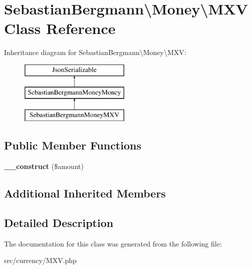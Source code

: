 \hypertarget{classSebastianBergmann_1_1Money_1_1MXV}{}\section{Sebastian\+Bergmann\textbackslash{}Money\textbackslash{}M\+X\+V Class Reference}
\label{classSebastianBergmann_1_1Money_1_1MXV}
Inheritance diagram for Sebastian\+Bergmann\textbackslash{}Money\textbackslash{}M\+X\+V\+:\begin{figure}[H]
\begin{center}
\leavevmode
\includegraphics[height=3.000000cm]{classSebastianBergmann_1_1Money_1_1MXV}
\end{center}
\end{figure}
\subsection*{Public Member Functions}
\begin{DoxyCompactItemize}
\item 
\hypertarget{classSebastianBergmann_1_1Money_1_1MXV_a330e71746be098c0213eb1fe7a962438}{}{\bfseries \+\_\+\+\_\+construct} (\$amount)\label{classSebastianBergmann_1_1Money_1_1MXV_a330e71746be098c0213eb1fe7a962438}

\end{DoxyCompactItemize}
\subsection*{Additional Inherited Members}


\subsection{Detailed Description}


The documentation for this class was generated from the following file\+:\begin{DoxyCompactItemize}
\item 
src/currency/M\+X\+V.\+php\end{DoxyCompactItemize}
